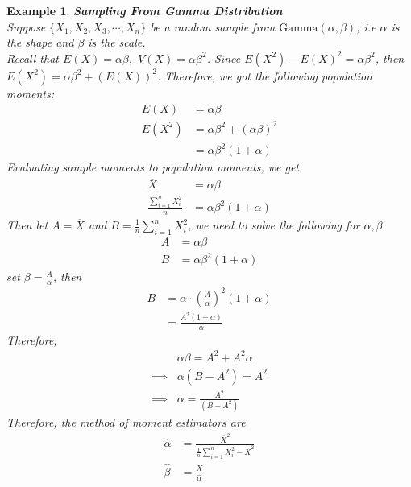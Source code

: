 \documentclass[11pt,oneside]{book}
\theoremstyle{newStyle}
\newtheorem{ex}{Example}[section]
\begin{document}
\begin{ex}
\textbf{Sampling From Gamma Distribution}\\
Suppose $\{X_1,X_2,X_3,\cdots,X_n\}$ be a random sample from $\text{Gamma}(\alpha,\beta)$, i.e $\alpha$ is the shape and $\beta$ is the scale.\\
Recall that $E(X)=\alpha \beta,$ $V(X)=\alpha \beta^2$. Since $E(X^2)-E(X)^2=\alpha \beta^2$, then $E(X^2)=\alpha \beta^2+(E(X))^2$. Therefore, we got the following population moments:\begin{align*}
E(X)&=\alpha \beta\\
E(X^2)&=\alpha \beta^2+(\alpha \beta)^2\\
&=\alpha \beta^2(1+\alpha)
\end{align*}
Evaluating sample moments to population moments, we get\begin{align*}
\overline{X}&=\alpha \beta\\
\frac{\sum_{i=1}^nX_i^2}{n}&=\alpha \beta^2(1+\alpha)
\end{align*}
Then let $A=\overline{X}$ and $B=\frac{1}{n}\sum_{i=1}^nX_i^2$, we need to solve the following for $\alpha,\beta$\begin{align*}
A&=\alpha \beta\\
B&=\alpha \beta^2(1+\alpha)
\end{align*}
set $\beta =\frac{A}{\alpha}$, then \begin{align*}
B&=\alpha \cdot \left(\frac{A}{\alpha} \right)^2(1+\alpha)\\
&=\frac{A^2(1+\alpha)}{\alpha}
\end{align*}
Therefore, \begin{align*}
&\alpha \beta =A^2+A^2\alpha\\
\implies &\alpha(B-A^2)=A^2\\
\implies &\alpha =\frac{A^2}{(B-A^2)}
\end{align*}
Therefore, the method of moment estimators are \begin{align*}
\widehat{\alpha}&=\frac{\overline{X}^2}{\frac{1}{n}\sum_{i=1}^nX_i^2-\overline{X}^2}\\
\widehat{\beta}&=\frac{\overline{X}}{\widehat{\alpha}}
\end{align*}
\end{ex}
\end{document}
